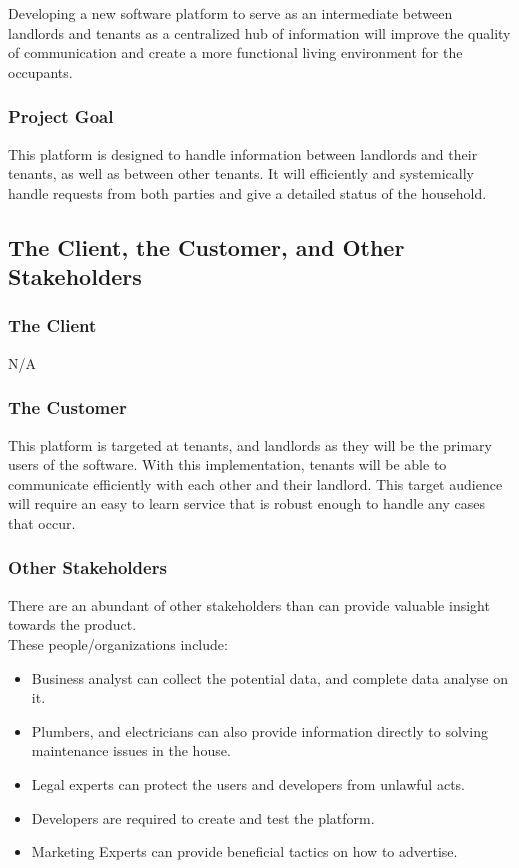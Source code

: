 \documentclass[12pt, titlepage]{article}
\begin{document}
Developing a new software platform to serve as an intermediate between 
landlords and tenants  as a centralized hub of information will improve 
the quality of communication and create a more functional living environment 
for the occupants.

\subsubsection{Project Goal}
This platform is designed to handle information between landlords and their 
tenants, as well as between other tenants. It will efficiently and systemically 
handle requests from both parties and give a detailed status of the household.

\subsection{The Client, the Customer, and Other Stakeholders}
\subsubsection {The Client}
  N/A
\subsubsection {The Customer}
This platform is targeted at tenants, and landlords as they will be the 
primary users of the software. With this implementation, tenants will be 
able to communicate efficiently with each other and their landlord. This target 
audience will require an easy to learn service that is robust enough to handle 
any cases that occur.
\subsubsection {Other Stakeholders}
There are an abundant of other stakeholders than can provide valuable insight 
towards the product. \\
These people/organizations include:\\
\begin{itemize}
\item Business analyst can collect the potential data, and complete data 
analyse on it.
\item Plumbers, and electricians can also provide information directly to 
solving maintenance issues in the house.
\item Legal experts can protect the users and developers from unlawful acts.
\item Developers are required to create and test the platform.
\item Marketing Experts can provide beneficial tactics on how to advertise.
\end{itemize}
\end{document}
